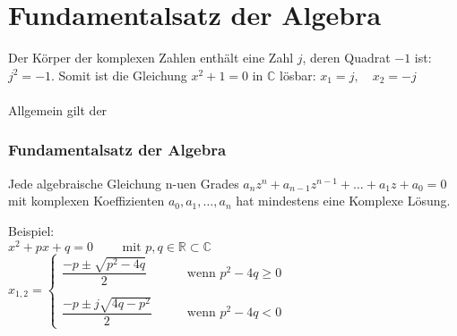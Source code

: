 \section{Fundamentalsatz der Algebra}
Der Körper der komplexen Zahlen enthält eine Zahl $j$, deren Quadrat $-1$ ist: $j^2 = -1$. Somit ist die Gleichung $x^2 + 1 = 0$ in $\mathbb{C}$ lösbar: $x_1 = j, \quad x_2 = -j$\\\\
Allgemein gilt der
\subsubsection{Fundamentalsatz der Algebra}
\begin{framed}\noindent
  Jede algebraische Gleichung n-uen Grades $a_n z^n + a_{n-1} z^{n-1} + \dots + a_1 z + a_0 = 0$ mit komplexen Koeffizienten $a_0, a_1, \dots, a_n$ hat mindestens eine Komplexe Lösung. 
\end{framed}\noindent
Beispiel: \\
$x^2 + px + q = 0 \qquad \text{ mit }p, q \in \mathbb{R} \subset \mathbb{C}$\\
$x_{1, 2} = \left\{ \begin{matrix}
  \dfrac{-p \pm \sqrt{p^2 - 4 q}}{2} \qquad & \text{wenn } p^2 - 4 q \geq 0\\\\
  \dfrac{-p \pm j \sqrt{4 q - p^2}}{2} \qquad & \text{wenn } p^2 - 4 q < 0
\end{matrix} \right.$

